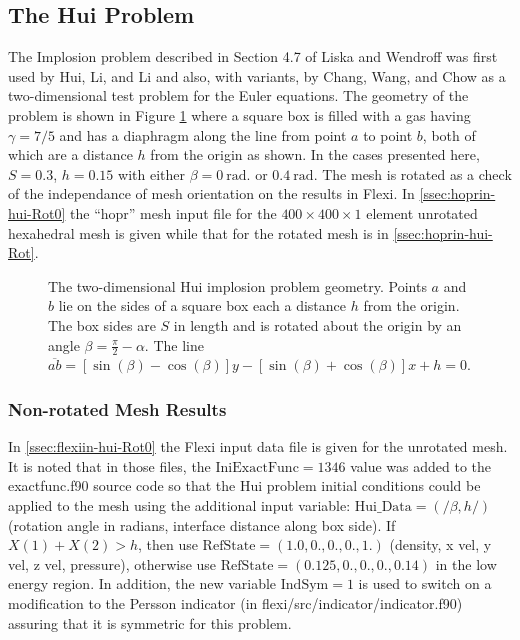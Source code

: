 
\subsection{The Hui Problem}\label{ss:hui}

The Implosion problem described in Section 4.7 of  Liska and Wendroff \cite{Liska} was first used by Hui, Li, and Li \cite{Hui} and also, with variants, by Chang, Wang, and Chow \cite{Chang} as a two-dimensional test problem for the Euler equations.  The geometry of the problem is shown in Figure \ref{fig:HuiGeom} where a square box is filled with a gas having $\gamma = 7/5$ and has a diaphragm along the line from point $a$ to point $b$, both of which are a distance $h$ from the origin as shown.  In the cases presented here, $S = 0.3$, $h = 0.15$ with either $\beta = 0 \ \mathrm{rad.}$ or $0.4\ \mathrm{rad.}$  The mesh is rotated as a check of the independance of mesh orientation on the results in Flexi.  In \ref{ssec:hoprin-hui-Rot0} the ``hopr'' mesh input file for the $400 \times 400 \times 1$ element unrotated hexahedral mesh is given while that for the rotated mesh is in \ref{ssec:hoprin-hui-Rot}.

\begin{figure}[h!]
 \begin{center}
  
  \caption{The two-dimensional Hui implosion problem geometry.  Points $a$ and $b$ lie on the sides of a square box each a distance $h$ from the origin. The box sides are $S$ in length and is rotated about the origin by an angle $\beta = \frac{\pi}{2} - \alpha$. The line $\overline{ab} = [\sin(\beta) - \cos(\beta)] y - [\sin(\beta) + \cos(\beta)] x + h = 0$.}
  \label{fig:HuiGeom}
 \end{center}
\end{figure}

\subsubsection{Non-rotated Mesh Results}\label{sssec:huiNR}

In \ref{ssec:flexiin-hui-Rot0} the Flexi input data file is given for the unrotated mesh.  It is noted that in those files, the $\mathrm{IniExactFunc}  = 1346$ value was added to the exactfunc.f90 source code so that the Hui problem initial conditions could be applied to the mesh using the additional input variable: $\mathrm{Hui\_Data} = (/\beta, h/)$ (rotation angle in radians, interface distance along box side).  If $X(1) + X(2) > h$, then use $\mathrm{RefState} = (1.0, 0., 0., 0.,  1. )$ (density, x vel, y vel, z vel, pressure), otherwise use $\mathrm{RefState} = (0.125, 0., 0., 0., 0.14 )$ in the low energy region. In addition, the new variable $\mathrm{IndSym} = 1$ is used to switch on a modification to the Persson indicator (in flexi/src/indicator/indicator.f90) assuring that it is symmetric for this problem.

